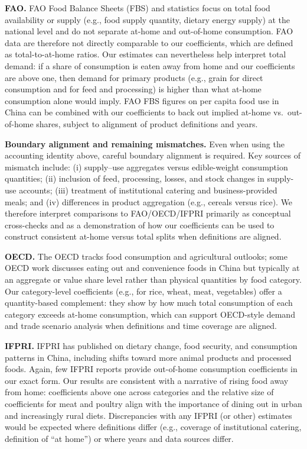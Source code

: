 \textbf{FAO.} FAO Food Balance Sheets (FBS) and statistics focus on total food availability or supply (e.g., food supply quantity, dietary energy supply) at the national level and do not separate at-home and out-of-home consumption. FAO data are therefore not directly comparable to our coefficients, which are defined as total-to-at-home ratios. Our estimates can nevertheless help interpret total demand: if a share of consumption is eaten away from home and our coefficients are above one, then demand for primary products (e.g., grain for direct consumption and for feed and processing) is higher than what at-home consumption alone would imply. FAO FBS figures on per capita food use in China can be combined with our coefficients to back out implied at-home vs.\ out-of-home shares, subject to alignment of product definitions and years.

\textbf{Boundary alignment and remaining mismatches.} Even when using the accounting identity above, careful boundary alignment is required. Key sources of mismatch include: (i) supply--use aggregates versus edible-weight consumption quantities; (ii) inclusion of feed, processing, losses, and stock changes in supply-use accounts; (iii) treatment of institutional catering and business-provided meals; and (iv) differences in product aggregation (e.g., cereals versus rice). We therefore interpret comparisons to FAO/OECD/IFPRI primarily as conceptual cross-checks and as a demonstration of how our coefficients can be used to construct consistent at-home versus total splits when definitions are aligned.

\textbf{OECD.} The OECD tracks food consumption and agricultural outlooks; some OECD work discusses eating out and convenience foods in China but typically at an aggregate or value share level rather than physical quantities by food category. Our category-level coefficients (e.g., for rice, wheat, meat, vegetables) offer a quantity-based complement: they show by how much total consumption of each category exceeds at-home consumption, which can support OECD-style demand and trade scenario analysis when definitions and time coverage are aligned.

\textbf{IFPRI.} IFPRI has published on dietary change, food security, and consumption patterns in China, including shifts toward more animal products and processed foods. Again, few IFPRI reports provide out-of-home consumption coefficients in our exact form. Our results are consistent with a narrative of rising food away from home: coefficients above one across categories and the relative size of coefficients for meat and poultry align with the importance of dining out in urban and increasingly rural diets. Discrepancies with any IFPRI (or other) estimates would be expected where definitions differ (e.g., coverage of institutional catering, definition of “at home”) or where years and data sources differ.

